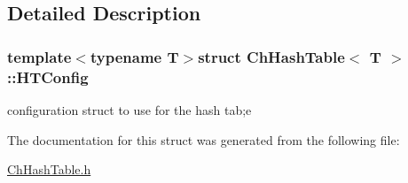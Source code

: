 \subsection{Detailed Description}
\subsubsection*{template$<$typename T$>$struct Ch\-Hash\-Table$<$ T $>$\-::\-H\-T\-Config}

configuration struct to use for the hash tab;e 

The documentation for this struct was generated from the following file\-:\begin{DoxyCompactItemize}
\item 
\hyperlink{ChHashTable_8h}{Ch\-Hash\-Table.\-h}\end{DoxyCompactItemize}

